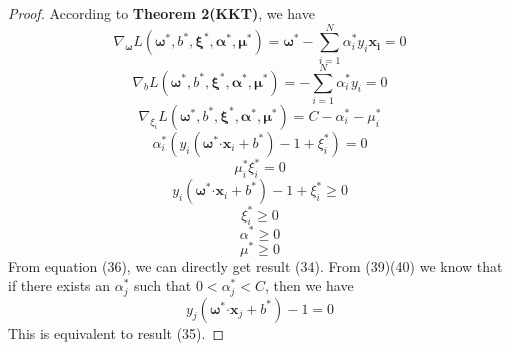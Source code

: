 \begin{proof}
  According to \textbf{Theorem 2(KKT)}, we have
  \begin{equation}
    \nabla_{\bm\omega} L(\bm\omega^*,b^*,\bm\xi^*,\bm\alpha^*,\bm\mu^*)=\bm\omega^*-\sum\limits_{i=1}^{N}\alpha_{i}^*y_{i}\bm{x_{i}}=0
  \end{equation}
  \begin{equation}
    \nabla_{b} L(\bm\omega^*,b^*,\bm\xi^*,\bm\alpha^*,\bm\mu^*)=-\sum\limits_{i=1}^{N}\alpha_{i}^*y_{i}=0
  \end{equation}
  \begin{equation}
    \nabla_{\xi_{i}} L(\bm\omega^*,b^*,\bm\xi^*,\bm\alpha^*,\bm\mu^*)=C-\alpha_{i}^*-\mu_{i}^*
  \end{equation}
  \begin{equation}
    \alpha_{i}^*(y_{i}(\bm\omega^*\bm\cdot \bm x_{i}+b^*)-1+\xi_{i}^*)= 0
  \end{equation}
  \begin{equation}
    \mu_{i}^*\xi_{i}^*=0
  \end{equation}
  \begin{equation}
    y_{i}(\bm\omega^*\bm\cdot \bm x_{i}+b^*)-1+\xi_{i}^*\geqslant 0
  \end{equation}
  \begin{equation}
    \xi_{i}^*\geqslant 0
  \end{equation}
  \begin{equation}
    \alpha^*\geqslant 0
  \end{equation}
  \begin{equation}
    \mu^*\geqslant 0
  \end{equation}
  From equation (36), we can directly get result (34).
  From (39)(40) we know that if there exists an $\alpha_{j}^*$ such that $0<\alpha_{j}^*<C$, then we have
  $$y_{j}(\bm\omega^*\bm\cdot \bm x_{j}+b^*)-1=0$$
  This is equivalent to result (35).
\end{proof}

